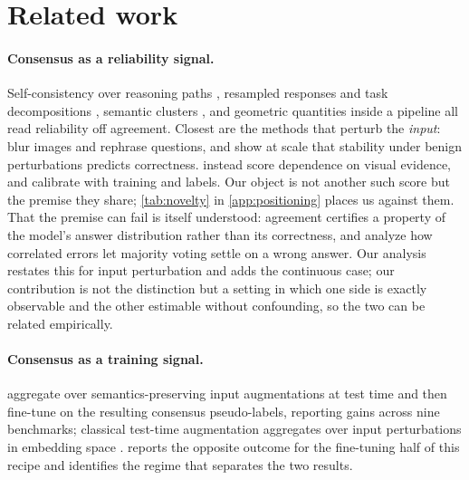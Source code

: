 \documentclass[11pt]{article}
\begin{document}
\section{Related work}
\label{sec:related}

\paragraph{Consensus as a reliability signal.} Self-consistency over reasoning paths \citep{wang2023selfconsistency}, resampled responses and task decompositions \citep{khan2024consistency,yang2024decc}, semantic clusters \citep{kuhn2023semantic,farquhar2024semantic}, and geometric quantities inside a pipeline \citep{kim2026zoomconsistency} all read reliability off agreement. Closest are the methods that perturb the \emph{input}: \citet{zhang2024vluncertainty} blur images and rephrase questions, and \citet{rosenfeld2025stability} show at scale that stability under benign perturbations predicts correctness. \citet{park2026vauq} instead score dependence on visual evidence, and \citet{xiao2026vlcalibration} calibrate with training and labels. Our object is not another such score but the premise they share; \cref{tab:novelty} in \cref{app:positioning} places us against them. That the premise can fail is itself understood: agreement certifies a property of the model's answer distribution rather than its correctness, and \citet{estornell2024debate} analyze how correlated errors let majority voting settle on a wrong answer. Our analysis restates this for input perturbation and adds the continuous case; our contribution is not the distinction but a setting in which one side is exactly observable and the other estimable without confounding, so the two can be related empirically.

\paragraph{Consensus as a training signal.} \citet{kaya2026efficient} aggregate over semantics-preserving input augmentations at test time and then fine-tune on the resulting consensus pseudo-labels, reporting gains across nine benchmarks; classical test-time augmentation aggregates over input perturbations in embedding space \citep{zanella2024mta}.  reports the opposite outcome for the fine-tuning half of this recipe and identifies the regime that separates the two results.
\end{document}

